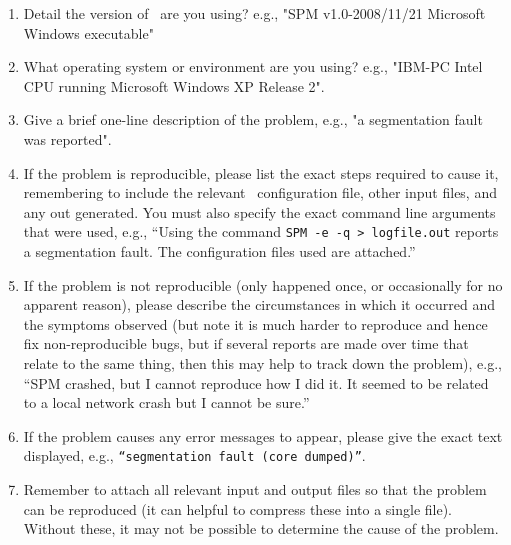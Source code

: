 \begin{enumerate}
\item Detail the version of \SPM\ are you using? e.g., "SPM v1.0-2008/11/21 Microsoft Windows executable"

\item What operating system or environment are you using? e.g., "IBM-PC Intel CPU running Microsoft Windows XP Release 2".

\item Give a brief one-line description of the problem, e.g., "a segmentation fault was reported".

\item If the problem is reproducible, please list the exact steps required to cause it, remembering to include the relevant \SPM\ configuration file, other input files, and any out generated. You must also specify the exact command line arguments that were used, e.g., ``Using the command \texttt{SPM -e -q > logfile.out} reports a segmentation fault. The configuration files used are attached.''

\item If the problem is not reproducible (only happened once, or occasionally for no apparent reason), please describe the circumstances in which it occurred and the symptoms observed (but note it is much harder to reproduce and hence fix non-reproducible bugs, but if several reports are made over time that relate to the same thing, then this may help to track down the problem), e.g., ``SPM crashed, but I cannot reproduce how I did it. It seemed to be related to a local network crash but I cannot be sure.''

\item If the problem causes any error messages to appear, please give the exact text displayed, e.g., \texttt{``segmentation fault (core dumped)''}.

\item Remember to attach all relevant input and output files so that the problem can be reproduced (it can helpful to compress these into a single file). Without these, it may not be possible to determine the cause of the problem.

\end{enumerate}
